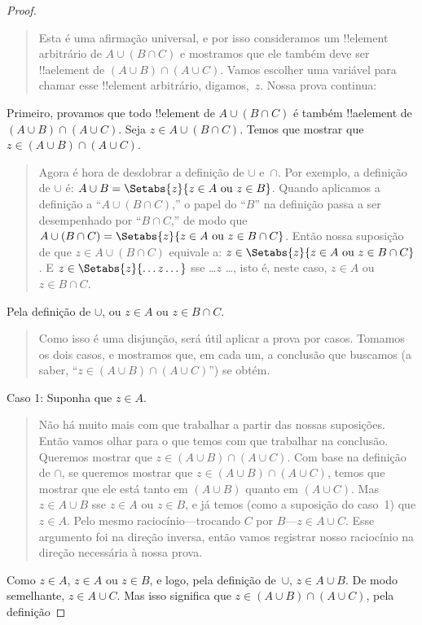 \documentclass[../../../include/open-logic-section]{subfiles}
\begin{document}
\begin{proof}
\begin{quote}
Esta é uma afirmação universal, e por isso consideramos um !!{element}
arbitrário de $A \cup (B \cap C)$ e mostramos que ele também deve ser !!a{element} de
$(A \cup B) \cap (A \cup C)$. Vamos escolher uma variável para chamar esse
!!{element} arbitrário, digamos,~$z$.  Nossa prova continua:
\end{quote}
Primeiro, provamos que todo !!{element} de $A \cup (B \cap C)$ é também
!!a{element} de $(A \cup B) \cap (A \cup C)$. Seja $z \in A \cup (B
\cap C)$. Temos que mostrar que $z \in (A \cup B) \cap (A \cup C)$.
\begin{quote}  
Agora é hora de desdobrar a definição de $\cup$ e~$\cap$. Por
exemplo, a definição de $\cup$ é: $A \cup B = \Setabs{z}{z \in A
  \text{ ou } z \in B}$.  Quando aplicamos a definição a ``$A \cup (B
\cap C)$,'' o papel do ``$B$'' na definição passa a ser desempenhado por
``$B \cap C$,'' de modo que $A \cup (B \cap C) = \Setabs{z}{z \in A \text{ ou }
  z \in B \cap C}$.  Então nossa suposição de que $z \in A \cup (B \cap C)$
equivale a: $z \in \Setabs{z}{z \in A \text{ ou } z \in B \cap
  C}$. E $z \in \Setabs{z}{\dots z\dots}$ sse \dots $z$ \dots, isto é,
neste caso, $z \in A$ ou $z \in B \cap C$.
\end{quote}
Pela definição de $\cup$, ou $z \in A$ ou $z \in B \cap C$.
\begin{quote}
Como isso é uma disjunção, será útil aplicar a prova por
casos. Tomamos os dois casos, e mostramos que, em cada um, a
conclusão que buscamos (a saber, ``$z \in (A \cup B) \cap (A \cup
C)$'') se obtém.
\end{quote}
Caso 1: Suponha que $z \in A$.
\begin{quote}
Não há muito mais com que trabalhar a partir das nossas suposições. Então vamos
olhar para o que temos com que trabalhar na conclusão. Queremos mostrar
que $z \in (A \cup B) \cap (A \cup C)$. Com base na definição de
$\cap$, se queremos mostrar que $z \in (A \cup B) \cap (A \cup C)$,
temos que mostrar que ele está tanto em $(A \cup B)$ quanto em $(A \cup C)$. Mas $z
\in A \cup B$ sse $z \in A$ ou $z \in B$, e já temos (como a
suposição do caso~1) que $z \in A$. Pelo mesmo
raciocínio---trocando $C$ por $B$---$z \in A \cup C$. Esse argumento
foi na direção inversa, então vamos registrar nosso raciocínio na
direção necessária à nossa prova.
\end{quote}
Como $z \in A$, $z \in A$ ou $z \in B$, e logo, pela definição
de~$\cup$, $z \in A \cup B$. De modo semelhante, $z \in A \cup C$.  Mas isso
significa que $z \in (A \cup B) \cap (A \cup C)$, pela definição

\end{proof}
\end{document}
